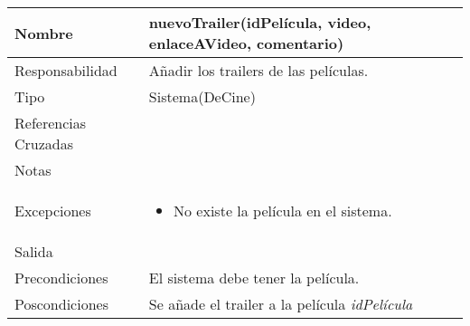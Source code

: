 \documentclass{article}
\begin{document}
\begin{table}[h]
\begin{tabular}{|l|l|l|l|l|l|}
\hline
\multicolumn{2}{|p{3cm}|}{Nombre} & \multicolumn{4}{p{10cm}|}{\textbf{nuevoTrailer(idPelícula, video, enlaceAVideo, comentario)}}\\
\hline
\multicolumn{2}{|p{3cm}|}{Responsabilidad} & \multicolumn{4}{p{10cm}|}{Añadir los trailers de las películas.} \\
\hline
\multicolumn{2}{|p{3cm}|}{Tipo} & \multicolumn{4}{p{10cm}|}{Sistema(DeCine)} \\
\hline
\multicolumn{2}{|p{3cm}|}{Referencias Cruzadas} & \multicolumn{4}{p{10cm}|}{} \\
\hline
\multicolumn{2}{|p{3cm}|}{Notas} & \multicolumn{4}{p{10cm}|}{} \\
\hline
\multicolumn{2}{|p{3cm}|}{Excepciones} & \multicolumn{4}{p{10cm}|}{\begin{itemize}
\item No existe la película en el sistema.
\end{itemize}} \\
\hline
\multicolumn{2}{|p{3cm}|}{Salida} & \multicolumn{4}{p{10cm}|}{} \\
\hline
\multicolumn{2}{|p{3cm}|}{Precondiciones} & \multicolumn{4}{p{10cm}|}{El sistema debe tener la película.} \\
\hline
\multicolumn{2}{|p{3cm}|}{Poscondiciones} & \multicolumn{4}{p{10cm}|}{Se añade el trailer a la película \textit{idPelícula}} \\
\hline
\end{tabular}
\end{table}
\end{document}
